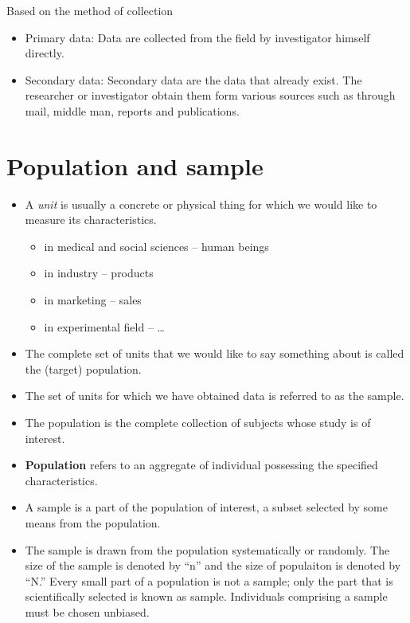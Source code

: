 \documentclass[
  ignorenonframetext,
  aspectratio=169]{beamer}
\providecommand{\tightlist}{%
  \setlength{\itemsep}{0pt}\setlength{\parskip}{0pt}}
\def\labelitemi{$\bullet$}
\begin{document}
\begin{frame}{Based on the method of collection}
\protect\hypertarget{based-on-the-method-of-collection}{}
\begin{itemize}
\tightlist
\item
  Primary data: Data are collected from the field by investigator
  himself directly.
\item
  Secondary data: Secondary data are the data that already exist. The
  researcher or investigator obtain them form various sources such as
  through mail, middle man, reports and publications.
\end{itemize}
\end{frame}

\hypertarget{population-and-sample}{%
\section{Population and sample}\label{population-and-sample}}

\begin{frame}{}
\protect\hypertarget{section-2}{}
\begin{itemize}
\tightlist
\item
  A \alert{\textit{unit}} is usually a concrete or physical thing for
  which we would like to measure its characteristics.

  \begin{itemize}
  \tightlist
  \item
    in medical and social sciences -- human beings
  \item
    in industry -- products
  \item
    in marketing -- sales
  \item
    in experimental field -- \ldots{}
  \end{itemize}
\item
  The complete set of units that we would like to say something about is
  called the (target) \alert{population}.
\item
  The set of units for which we have obtained data is referred to as the
  \alert{sample}.
\end{itemize}

\footnotesize
\renewcommand{\labelitemi}{$\diamond$}

\begin{itemize}
\tightlist
\item
  The population is the complete collection of subjects whose study is
  of interest.
\item
  \textbf{Population} refers to an aggregate of individual possessing
  the specified characteristics.
\item
  A sample is a part of the population of interest, a subset selected by
  some means from the population.
\item
  The sample is drawn from the population systematically or randomly.
  The size of the sample is denoted by ``n'' and the size of populaiton
  is denoted by ``N.'' Every small part of a population is not a sample;
  only the part that is scientifically selected is known as sample.
  Individuals comprising a sample must be chosen unbiased.
\end{itemize}
\end{frame}
\end{document}

